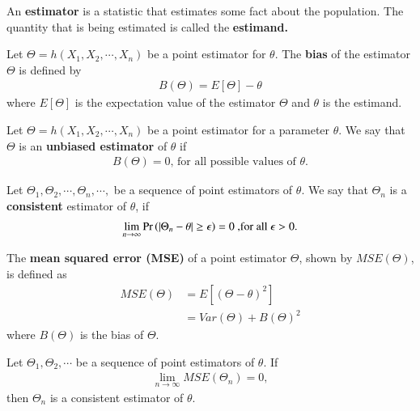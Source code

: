 \begin{definition}
    An \textbf{estimator} is a statistic that estimates some fact about the population.
    The quantity that is being estimated is called the \textbf{estimand.} 
    \end{definition}
    \begin{definition}
    Let $ \Theta = h(X_1,X_2, \cdots, X_n) $  be a point estimator for $ \theta$. The \textbf{bias} of the estimator $ \Theta $ is defined by 
    \begin{align}
        B(\Theta ) = E[\Theta ] - \theta
    \end{align}
    where $ E[\Theta ]$ is the expectation value of the estimator $ \Theta $ and $ \theta$ is the estimand.
    \end{definition}
        \begin{definition}
        Let $\Theta = h(X_1,X_2, \cdots , X_n) $ be a point estimator for a parameter $ \theta $. We say that $ \Theta $ is an \textbf{unbiased estimator} of $ \theta $ if
        \begin{align}
           B(\Theta )= 0 \text{, for all possible values of $\theta$.}
        \end{align}
        \end{definition} 
    \begin{definition}
    Let $ \Theta_1,\Theta_2, \cdots, \Theta_n , \cdots, $  be a sequence of point estimators of $ \theta $. We say that $ \Theta_n $ is a \textbf{consistent} estimator of $ \theta $, if 
    \begin{align}
        \lim_{n\to\infty} \Pr\left(| \Theta_n - \theta | \ge \epsilon\right) = 0 \text{ ,for all $ \epsilon > 0$.}
    \end{align}
    \end{definition}
    \begin{definition}
    The \textbf{mean squared error (MSE)} of a point estimator $ \Theta $, shown by $ MSE(\Theta) $, is defined as
    \begin{align}
        MSE(\Theta ) &= E[(\Theta - \theta)^2] \\
        &= Var(\Theta) + B(\Theta)^2
    \end{align}
    where $ B(\Theta ) $ is the bias of $ \Theta $. 
    \end{definition}    
    \begin{theorem}
     Let $ \Theta_1,\Theta_2 , \cdots$ be a sequence of point estimators of $ \theta $. If
    \begin{align}
         \lim_{n\to\infty} MSE( \Theta_n) = 0,
    \end{align}
    then $ \Theta_n $ is a consistent estimator of $ \theta$.
    \end{theorem}

